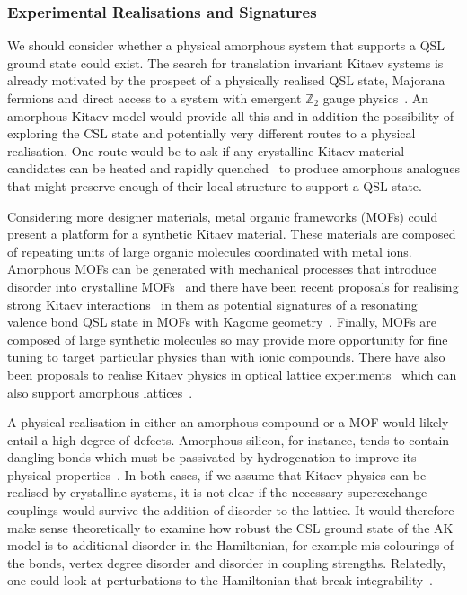 \hypertarget{experimental-realisations-and-signatures}{%
\subsubsection{Experimental Realisations and Signatures}\label{experimental-realisations-and-signatures}}

We should consider whether a physical amorphous system that supports a QSL ground state could exist. The search for translation invariant Kitaev systems is already motivated by the prospect of a physically realised QSL state, Majorana fermions and direct access to a system with emergent \(\mathbb{Z}_2\) gauge physics~\autocite{TrebstPhysRep2022}. An amorphous Kitaev model would provide all this and in addition the possibility of exploring the CSL state and potentially very different routes to a physical realisation. One route would be to ask if any crystalline Kitaev material candidates can be heated and rapidly quenched~\autocite{Weaire1976,Petrakovski1981,Kaneyoshi2018} to produce amorphous analogues that might preserve enough of their local structure to support a QSL state.

Considering more designer materials, metal organic frameworks (MOFs) could present a platform for a synthetic Kitaev material. These materials are composed of repeating units of large organic molecules coordinated with metal ions. Amorphous MOFs can be generated with mechanical processes that introduce disorder into crystalline MOFs~\autocite{bennett2014amorphous} and there have been recent proposals for realising strong Kitaev interactions~\autocite{yamadaDesigningKitaevSpin2017} in them as potential signatures of a resonating valence bond QSL state in MOFs with Kagome geometry~\autocite{misumiQuantumSpinLiquid2020}. Finally, MOFs are composed of large synthetic molecules so may provide more opportunity for fine tuning to target particular physics than with ionic compounds. There have also been proposals to realise Kitaev physics in optical lattice experiments~\autocite{duanControllingSpinExchange2003,micheliToolboxLatticespinModels2006} which can also support amorphous lattices~\autocite{sadeghiAmorphousTwodimensionalOptical2005}.

A physical realisation in either an amorphous compound or a MOF would likely entail a high degree of defects. Amorphous silicon, for instance, tends to contain dangling bonds which must be passivated by hydrogenation to improve its physical properties~\autocite{streetHydrogenatedAmorphousSilicon1991}. In both cases, if we assume that Kitaev physics can be realised by crystalline systems, it is not clear if the necessary superexchange couplings would survive the addition of disorder to the lattice. It would therefore make sense theoretically to examine how robust the CSL ground state of the AK model is to additional disorder in the Hamiltonian, for example mis-colourings of the bonds, vertex degree disorder and disorder in coupling strengths. Relatedly, one could look at perturbations to the Hamiltonian that break integrability~\autocite{Rau2014,Chaloupka2010,Chaloupka2013,Chaloupka2015,Winter2016}.

